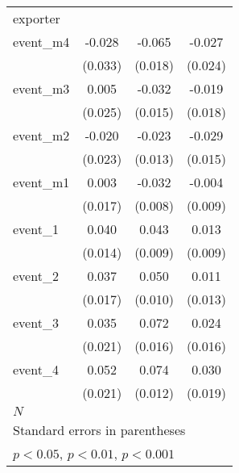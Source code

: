 {\begin{tabular}{l*{3}{c}}
\hline
exporter    &                     &                     &                     \\
event\_m4    &      -0.028         &      -0.065\sym{***}&      -0.027         \\
            &     (0.033)         &     (0.018)         &     (0.024)         \\
[1em]
event\_m3    &       0.005         &      -0.032\sym{*}  &      -0.019         \\
            &     (0.025)         &     (0.015)         &     (0.018)         \\
[1em]
event\_m2    &      -0.020         &      -0.023         &      -0.029         \\
            &     (0.023)         &     (0.013)         &     (0.015)         \\
[1em]
event\_m1    &       0.003         &      -0.032\sym{***}&      -0.004         \\
            &     (0.017)         &     (0.008)         &     (0.009)         \\
[1em]
event\_1     &       0.040\sym{**} &       0.043\sym{***}&       0.013         \\
            &     (0.014)         &     (0.009)         &     (0.009)         \\
[1em]
event\_2     &       0.037\sym{*}  &       0.050\sym{***}&       0.011         \\
            &     (0.017)         &     (0.010)         &     (0.013)         \\
[1em]
event\_3     &       0.035         &       0.072\sym{***}&       0.024         \\
            &     (0.021)         &     (0.016)         &     (0.016)         \\
[1em]
event\_4     &       0.052\sym{*}  &       0.074\sym{***}&       0.030         \\
            &     (0.021)         &     (0.012)         &     (0.019)         \\
\hline
\(N\)       &                     &                     &                     \\
\hline\hline
\multicolumn{4}{l}{\footnotesize Standard errors in parentheses}\\
\multicolumn{4}{l}{\footnotesize \sym{*} \(p<0.05\), \sym{**} \(p<0.01\), \sym{***} \(p<0.001\)}\\
\end{tabular}
}
